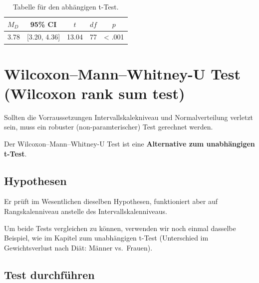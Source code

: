 \documentclass[
]{book}
\begin{document}
\begin{table}[tbp]

\begin{center}
\begin{threeparttable}

\caption{\label{tab:unnamed-chunk-262}Tabelle für den abhängigen t-Test.}

\begin{tabular}{lllll}
\toprule
$M_D$ & \multicolumn{1}{c}{95\% CI} & \multicolumn{1}{c}{$t$} & \multicolumn{1}{c}{$\mathit{df}$} & \multicolumn{1}{c}{$p$}\\
\midrule
3.78 & {}[3.20, 4.36] & 13.04 & 77 & < .001\\
\bottomrule
\end{tabular}

\end{threeparttable}
\end{center}

\end{table}

\hypertarget{wilcoxonmannwhitney-u-test-wilcoxon-rank-sum-test}{%
\section{Wilcoxon--Mann--Whitney-U Test (Wilcoxon rank sum test)}\label{wilcoxonmannwhitney-u-test-wilcoxon-rank-sum-test}}

Sollten die Vorraussetzungen Intervallskalekniveau und Normalverteilung verletzt sein, muss ein robuster (non-paramterischer) Test gerechnet werden.

Der Wilcoxon--Mann--Whitney-U Test ist eine \textbf{Alternative zum unabhängigen t-Test}.

\hypertarget{hypothesen-4}{%
\subsection{Hypothesen}\label{hypothesen-4}}

Er prüft im Wesentlichen dieselben Hypothesen, funktioniert aber auf Rangskalenniveau anstelle des Intervallskalenniveaus.

Um beide Tests vergleichen zu können, verwenden wir noch einmal dasselbe Beispiel, wie im Kapitel zum unabhängigen t-Test (Unterschied im Gewichtsverlust nach Diät: Männer vs.~Frauen).

\hypertarget{test-durchfuxfchren-3}{%
\subsection{Test durchführen}\label{test-durchfuxfchren-3}}
\end{document}
